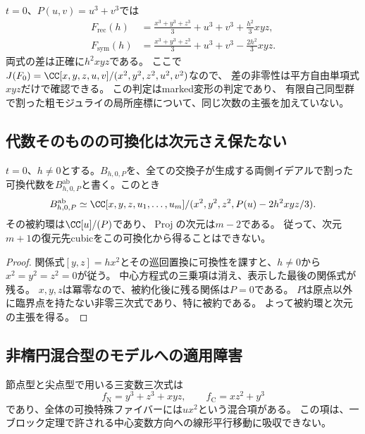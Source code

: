 \begin{example}[Fermatブロック]
\label{em:ex:fermat}
$t=0$、$P(u,v)=u^3+v^3$では
\begin{align*}
 F_{\mathrm{rec}}(h)&=\frac{x^3+y^3+z^3}{3}+u^3+v^3
                       +\frac{h^2}{3}xyz,\\
 F_{\mathrm{sym}}(h)&=\frac{x^3+y^3+z^3}{3}+u^3+v^3
                       -\frac{2h^2}{3}xyz.
\end{align*}
両式の差は正確に$h^2xyz$である。
ここで$J(F_0)=\CC[x,y,z,u,v]/(x^2,y^2,z^2,u^2,v^2)$なので、
差の非零性は平方自由単項式$xyz$だけで確認できる。
この判定はmarked変形の判定であり、
有限自己同型群で割った粗モジュライの局所座標について、同じ次数の主張を加えていない。
\end{example}

\subsection{代数そのものの可換化は次元さえ保たない}

\begin{proposition}[文字通りの可換化の失敗]
\label{em:prop:abelianization}
$t=0$、$h\ne0$とする。$B_{h,0,P}$を、全ての交換子が生成する両側イデアルで割った
可換代数を$B_{h,0,P}^{\mathrm{ab}}$と書く。このとき
\[
 B_{h,0,P}^{\mathrm{ab}}
 \simeq
 \CC[x,y,z,u_1,\ldots,u_m]
 /(x^2,y^2,z^2,P(u)-2h^2xyz/3).
\]
その被約環は$\CC[u]/(P)$であり、$\operatorname{Proj}$の次元は$m-2$である。
従って、次元$m+1$の復元先cubicをこの可換化から得ることはできない。
\end{proposition}
\begin{proof}
関係式$[y,z]=hx^2$とその巡回置換に可換性を課すと、$h\ne0$から
$x^2=y^2=z^2=0$が従う。
中心方程式の三乗項は消え、表示した最後の関係式が残る。
$x,y,z$は冪零なので、被約化後に残る関係は$P=0$である。
$P$は原点以外に臨界点を持たない非零三次式であり、特に被約である。
よって被約環と次元の主張を得る。
\end{proof}

\subsection{非楕円混合型のモデルへの適用障害}

節点型と尖点型で用いる三変数三次式は
\[
 f_{\mathrm N}=y^3+z^3+xyz,\qquad
 f_{\mathrm C}=xz^2+y^3
\]
であり、全体の可換特殊ファイバーには$ux^2$という混合項がある。
この項は、一ブロック定理で許される中心変数方向への線形平行移動に吸収できない。

